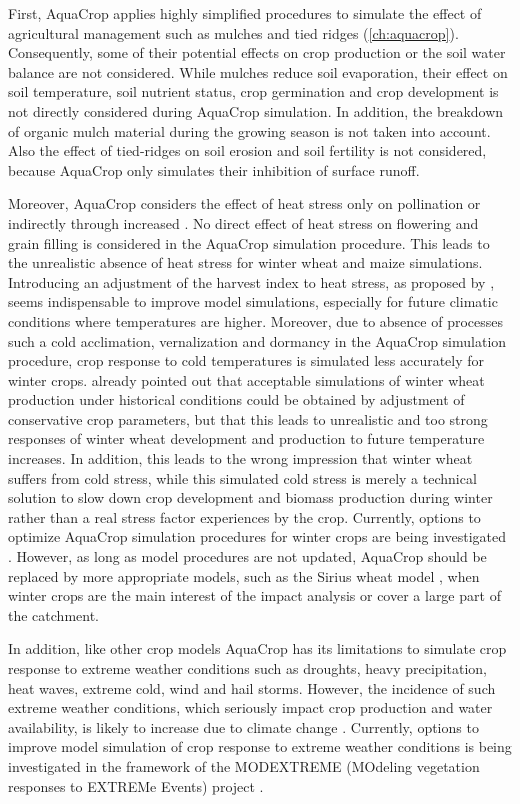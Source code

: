 First, AquaCrop applies highly simplified procedures to simulate the effect of agricultural management such as mulches and tied ridges (\autoref{ch:aquacrop}). Consequently, some of their potential effects on crop production or the soil water balance are not considered. While mulches reduce soil evaporation, their effect on soil temperature, soil  nutrient status, crop germination and crop development is not directly considered during AquaCrop simulation. In addition, the breakdown of organic mulch material during the growing season is not taken into account. Also the effect of tied-ridges on soil erosion and soil fertility is not considered, because AquaCrop only simulates their inhibition of surface runoff. 

Moreover, AquaCrop considers the effect of heat stress only on pollination or indirectly through increased \ETo. No direct effect of  heat stress on flowering and grain filling is considered in the AquaCrop simulation procedure. This leads to the unrealistic absence of heat stress for winter wheat and maize simulations. Introducing an adjustment of the harvest index to heat stress, as proposed by \textcite{villalobos2015},  seems indispensable to improve model simulations, especially for future climatic conditions where temperatures are higher. Moreover, due to absence of processes such a cold acclimation, vernalization and dormancy in the AquaCrop simulation procedure, crop response to cold temperatures is simulated less accurately for winter crops. \textcite{vanuytrecht2013} already pointed out that acceptable simulations of winter wheat production under historical conditions could be obtained by adjustment of conservative crop parameters, but that this leads to unrealistic and too strong responses of winter wheat development and production to future temperature increases. In addition, this leads to the wrong impression that winter wheat suffers from cold stress, while this simulated cold stress is merely a technical solution to slow down crop development and biomass production during winter rather than a real stress factor experiences by the crop. Currently, options to optimize AquaCrop simulation procedures for winter crops are being investigated \parencite{vanuytrecht2014a}. However, as long as model procedures are not updated, AquaCrop  should be replaced by more appropriate models, such as the Sirius wheat model \parencite{jamieson1998}, when winter crops are the main interest of the impact analysis or cover a large part of the catchment.

In addition, like other crop models AquaCrop has its limitations to simulate crop response to extreme weather conditions such as droughts, heavy precipitation, heat waves, extreme cold, wind and hail storms. However, the incidence of such extreme weather conditions, which seriously impact crop production and water availability, is likely to increase due to climate change \parencite{ipcc2014}. Currently, options to improve model simulation of crop response to extreme weather conditions is being investigated in the framework of the MODEXTREME (MOdeling vegetation responses to EXTREMe Events) project \parencite{villalobos2015}. 


